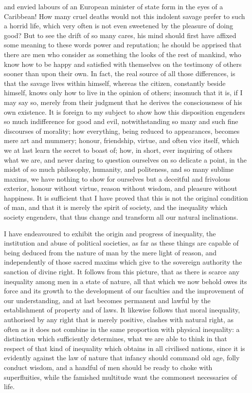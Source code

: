 \documentclass[11pt,twocolumn]{ltugboat}
\begin{document}
and envied labours of an European minister of state form in the eyes
of a Caribbean! How many cruel deaths would not this indolent savage
prefer to such a horrid life, which very often is not even sweetened
by the pleasure of doing good? But to see the drift of so many cares,
his mind should first have affixed some meaning to these words power
and reputation; he should be apprised that there are men who consider
as something the looks of the rest of mankind, who know how to be
happy and satisfied with themselves on the testimony of others sooner
than upon their own. In fact, the real source of all those
differences, is that the savage lives within himself, whereas the
citizen, constantly beside himself, knows only how to live in the
opinion of others; insomuch that it is, if I may say so, merely from
their judgment that he derives the consciousness of his own existence.
It is foreign to my subject to show how this disposition engenders so
much indifference for good and evil, notwithstanding so many and such
fine discourses of morality; how everything, being reduced to
appearances, becomes mere art and mummery; honour, friendship, virtue,
and often vice itself, which we at last learn the secret to boast of;
how, in short, ever inquiring of others what we are, and never daring
to question ourselves on so delicate a point, in the midst of so much
philosophy, humanity, and politeness, and so many sublime maxims, we
have nothing to show for ourselves but a deceitful and frivolous
exterior, honour without virtue, reason without wisdom, and pleasure
without happiness. It is sufficient that I have proved that this is
not the original condition of man, and that it is merely the spirit of
society, and the inequality which society engenders, that thus change
and transform all our natural inclinations.

I have endeavoured to exhibit the origin and progress of inequality,
the institution and abuse of political societies, as far as these
things are capable of being deduced from the nature of man by the mere
light of reason, and independently of those sacred maxims which give
to the sovereign authority the sanction of divine right. It follows
from this picture, that as there is scarce any inequality among men in
a state of nature, all that which we now behold owes its force and its
growth to the development of our faculties and the improvement of our
understanding, and at last becomes permanent and lawful by the
establishment of property and of laws. It likewise follows that moral
inequality, authorised by any right that is merely positive, clashes
with natural right, as often as it does not combine in the same
proportion with physical inequality: a distinction which sufficiently
determines, what we are able to think in that respect of that kind of
inequality which obtains in all civilised nations, since it is
evidently against the law of nature that infancy should command old
age, folly conduct wisdom, and a handful of men should be ready to
choke with superfluities, while the famished multitude want the
commonest necessaries of life.
\end{document}
